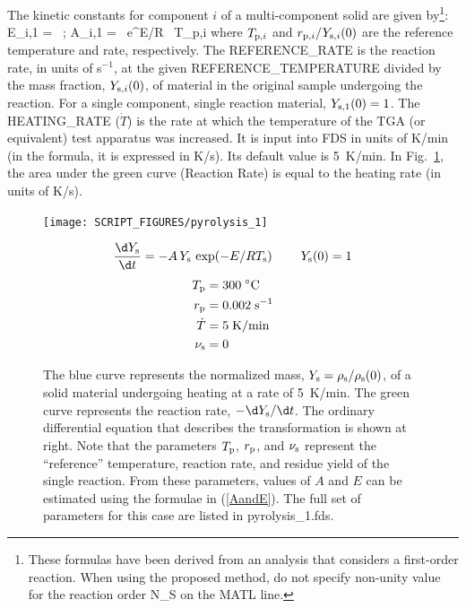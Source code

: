 \documentclass[11pt]{book}
\begin{document}
The kinetic constants for component $i$ of a multi-component solid are given by\footnote{These formulas have been derived from an analysis that considers a first-order reaction. When using the proposed method, do not specify non-unity value for the reaction order {\ct N\_S} on the {\ct MATL} line.}:
\be
   E_{i,1} =  \,  \quad ; \quad
   A_{i,1} =  \, {\rm e}^{E/R \, T_{{\rm p},i}} \label{AandE}
\ee
where $T_{{\rm p},i}$ and $r_{{\rm p},i}/Y_{{\rm s},i}(0)$ are the reference temperature and rate, respectively. The {\ct REFERENCE\_RATE} is the reaction rate, in units of s$^{-1}$, at the given {\ct REFERENCE\_TEMPERATURE} divided by the mass fraction, $Y_{{\rm s},i}(0)$, of material in the original sample undergoing the reaction. For a single component, single reaction material, $Y_{{\rm s},1}(0)=1$. The {\ct HEATING\_RATE} ($\dot{T}$) is the rate at which the temperature of the TGA (or equivalent) test apparatus was increased. It is input into FDS in units of K/min (in the formula, it is expressed in K/s). Its default value is 5~K/min. In Fig.~\ref{pyrolysis}, the area under the green curve (Reaction Rate) is equal to the heating rate (in units of K/s).

\begin{figure}[ht]
\noindent
\begin{minipage}{0.5\textwidth}
\texttt{[image: SCRIPT\_FIGURES/pyrolysis\_1]}
\end{minipage}
\hfill
\begin{minipage}{0.5\textwidth}
\begin{equation*}
   \frac{\d Y_{\rm s}}{\d t} = -A \, Y_{\rm s} \, \exp(-E/RT_{\rm s})   \quad \; \quad    Y_{\rm s}(0) =1
\end{equation*}
\begin{align*}
   T_{\rm p} &= 300 \; ^\circ\mathrm{C}  \\
   r_{\rm p} &= 0.002   \; \mathrm{s}^{-1}  \\
   \dot{T} &= 5 \; \mathrm{K/min} \\
   \nu_{\rm s} &= 0 \\
\end{align*}
\end{minipage}
\caption[Simple demonstration of the pyrolysis model]{The blue curve represents the normalized mass, $Y_{\rm s}=\rho_{\rm s}/\rho_{\rm s}(0)$, of a solid material
undergoing heating at a rate of 5~K/min. The green curve represents the reaction rate, $-\d Y_{\rm s}/\d t$. The ordinary differential equation that describes the transformation is shown at right. Note that the parameters $T_{\rm p}$, $r_{\rm p}$, and $\nu_{\rm s}$ represent the ``reference'' temperature,
reaction rate, and residue yield of the single reaction. From these parameters, values of $A$ and $E$ can be estimated using
the formulae in (\ref{AandE}). The full set of parameters for this case are listed in {\ct pyrolysis\_1.fds}.}
\label{pyrolysis}
\end{figure}
\end{document}
